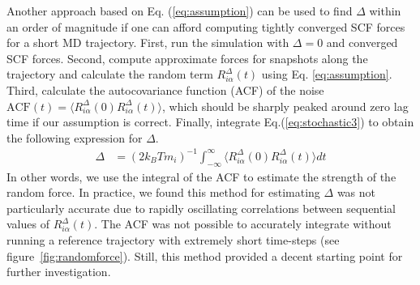 \documentclass[10pt,aps,prl,twocolumn,amsmath,amssymb,superscriptaddress,longbibliography]{revtex4-1}
\begin{document}
Another approach based on Eq. (\ref{eq:assumption}) can be used to find $\Delta$ within an order of magnitude if one can afford computing tightly converged SCF forces for a short MD trajectory. 
First, run the simulation with $\Delta = 0$ and converged SCF forces. 
Second, compute approximate forces for snapshots along the trajectory and calculate the random term $R^{\Delta}_{i\alpha} (t)$ using Eq. \ref{eq:assumption}. 
Third, calculate the autocovariance function (ACF) of the noise $\text{ACF}(t) = \langle R^{\Delta}_{i\alpha} (0)  R^{\Delta}_{i\alpha} (t) \rangle$, which should be sharply peaked around zero lag time if our assumption is correct. 
Finally, integrate Eq.(\ref{eq:stochastic3}) to obtain the following expression for $\Delta$.
%
\begin{align}
\label{eq:delta}
\Delta &= (2 k_B T m_i )^{-1} \int_{-\infty}^{\infty}\langle R^{\Delta}_{i\alpha} (0)  R^{\Delta}_{i\alpha} (t) \rangle dt
\end{align}
%
In other words, we use the integral of the ACF to estimate the strength of the random force. 
In practice, we found this method for estimating $\Delta$ was not particularly accurate due to rapidly oscillating correlations between sequential values of $R^{\Delta}_{i\alpha} (t)$. 
The ACF was not possible to accurately integrate without running a reference trajectory with extremely short time-steps (see figure~\ref{fig:randomforce}).
Still, this method provided a decent starting point for further investigation.
\end{document}
